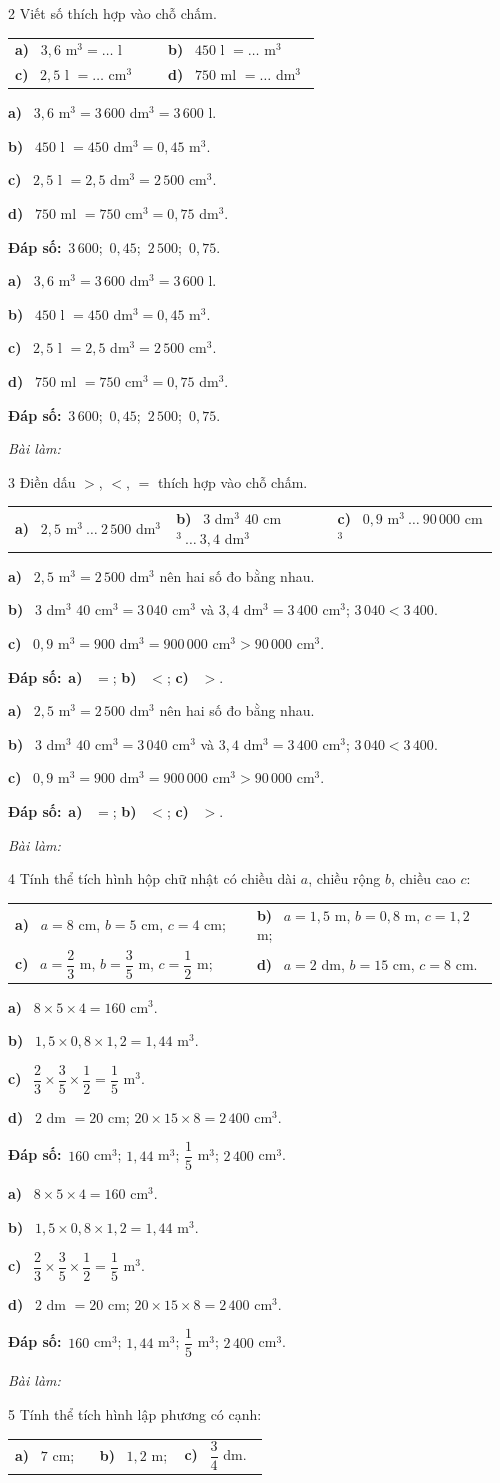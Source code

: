 \documentclass[11pt]{article}
\makeatletter
\newif\ifsol \soltrue
\renewcommand{\arraystretch}{1.35}
\providecommand{\AnsWord}{Đáp số}
\newcommand{\dapso}[1]{\par\textbf{\AnsWord:}\ #1}
\newcommand{\probsol}[1]{%
  \begin{lrbox}{\solmeasure}\begin{minipage}{\dimexpr\linewidth-24pt\relax}#1\end{minipage}\end{lrbox}%
  \ifsol
    \begin{solbox}#1\end{solbox}%
  \else
    \setlength{\solht}{\dimexpr\ht\solmeasure+\dp\solmeasure+0.85cm\relax}%
    \ifdim\solht<1.35cm\setlength{\solht}{1.35cm}\fi
    \begin{tcolorbox}[colback=white,colframe=Line,boxrule=0.8pt,arc=5pt,
      left=8pt,right=8pt,top=4pt,bottom=4pt,height=\solht]{\footnotesize\color{Slate}\itshape\WorkWord}\end{tcolorbox}%
  \fi}
\newcommand{\pa}[1]{\textbf{#1)}\ }
\newenvironment{cols2}{\par\vspace{3pt}\noindent\setlength{\tabcolsep}{0pt}\renewcommand{\arraystretch}{1.3}%
  \begin{tabular}{@{}>{\raggedright\arraybackslash\rule{0pt}{4.4ex}}p{0.48\linewidth}<{\rule[-2.3ex]{0pt}{0pt}}@{\hspace{0.03\linewidth}}>{\raggedright\arraybackslash\rule{0pt}{4.4ex}}p{0.48\linewidth}<{\rule[-2.3ex]{0pt}{0pt}}@{}}}%
  {\end{tabular}\par}
\newenvironment{cols3}{\par\vspace{3pt}\noindent\setlength{\tabcolsep}{0pt}\renewcommand{\arraystretch}{1.3}%
  \begin{tabular}{@{}>{\raggedright\arraybackslash\rule{0pt}{4.4ex}}p{0.32\linewidth}<{\rule[-2.3ex]{0pt}{0pt}}@{\hspace{0.015\linewidth}}>{\raggedright\arraybackslash\rule{0pt}{4.4ex}}p{0.32\linewidth}<{\rule[-2.3ex]{0pt}{0pt}}@{\hspace{0.015\linewidth}}>{\raggedright\arraybackslash\rule{0pt}{4.4ex}}p{0.32\linewidth}<{\rule[-2.3ex]{0pt}{0pt}}@{}}}%
  {\end{tabular}\par}
\newcommand{\gap}{\vspace{0.3cm}}
\def\WorkWord{Bài làm:}
\def\AnsWord{Đáp số}
\makeatother
\begin{document}
\gap
\begin{probbox}{2}{\relax}
Viết số thích hợp vào chỗ chấm.
\begin{cols2}
\pa{a} $3{,}6$ m$^3=\ldots$ l & \pa{b} $450$ l $=\ldots$ m$^3$\\
\pa{c} $2{,}5$ l $=\ldots$ cm$^3$ & \pa{d} $750$ ml $=\ldots$ dm$^3$
\end{cols2}
\end{probbox}
\probsol{
\pa{a} $3{,}6$ m$^3=3\,600$ dm$^3=3\,600$ l.\par
\pa{b} $450$ l $=450$ dm$^3=0{,}45$ m$^3$.\par
\pa{c} $2{,}5$ l $=2{,}5$ dm$^3=2\,500$ cm$^3$.\par
\pa{d} $750$ ml $=750$ cm$^3=0{,}75$ dm$^3$.
\dapso{$3\,600$;\ $0{,}45$;\ $2\,500$;\ $0{,}75$.}}
\gap
\begin{probbox}{3}{\relax}
Điền dấu $>$, $<$, $=$ thích hợp vào chỗ chấm.
\begin{cols3}
\pa{a} $2{,}5$ m$^3\ \ldots\ 2\,500$ dm$^3$ & \pa{b} $3$ dm$^3$ $40$ cm$^3\ \ldots\ 3{,}4$ dm$^3$ & \pa{c} $0{,}9$ m$^3\ \ldots\ 90\,000$ cm$^3$
\end{cols3}
\end{probbox}
\probsol{
\pa{a} $2{,}5$ m$^3=2\,500$ dm$^3$ nên hai số đo bằng nhau.\par
\pa{b} $3$ dm$^3$ $40$ cm$^3=3\,040$ cm$^3$ và $3{,}4$ dm$^3=3\,400$ cm$^3$; $3\,040<3\,400$.\par
\pa{c} $0{,}9$ m$^3=900$ dm$^3=900\,000$ cm$^3>90\,000$ cm$^3$.
\dapso{\pa{a} $=$; \pa{b} $<$; \pa{c} $>$.}}
\gap
\begin{probbox}{4}{\relax}
Tính thể tích hình hộp chữ nhật có chiều dài $a$, chiều rộng $b$, chiều cao $c$:
\begin{cols2}
\pa{a} $a=8$ cm, $b=5$ cm, $c=4$ cm; & \pa{b} $a=1{,}5$ m, $b=0{,}8$ m, $c=1{,}2$ m;\\
\pa{c} $a=\dfrac23$ m, $b=\dfrac35$ m, $c=\dfrac12$ m; & \pa{d} $a=2$ dm, $b=15$ cm, $c=8$ cm.
\end{cols2}
\end{probbox}
\probsol{
\pa{a} $8\times5\times4=160$ cm$^3$.\par
\pa{b} $1{,}5\times0{,}8\times1{,}2=1{,}44$ m$^3$.\par
\pa{c} $\dfrac23\times\dfrac35\times\dfrac12=\dfrac15$ m$^3$.\par
\pa{d} $2$ dm $=20$ cm; $20\times15\times8=2\,400$ cm$^3$.
\dapso{$160$ cm$^3$; $1{,}44$ m$^3$; $\dfrac15$ m$^3$; $2\,400$ cm$^3$.}}
\gap
\begin{probbox}{5}{\relax}
Tính thể tích hình lập phương có cạnh:
\begin{cols3}
\pa{a} $7$ cm; & \pa{b} $1{,}2$ m; & \pa{c} $\dfrac34$ dm.
\end{cols3}
\end{probbox}
\end{document}
